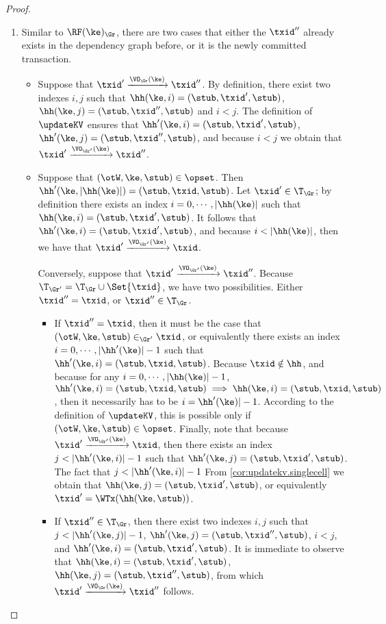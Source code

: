 \begin{proof}
\begin{enumerate}
\item 
Similar to \( \RF(\ke)_{\Gr} \), there are two cases that either the \( \txid'' \) already exists in the dependency graph before,
or it is the newly committed transaction.
\begin{itemize}
\item Suppose that $\txid' \xrightarrow{\VO_{\Gr}(\ke)} \txid''$. 
By definition, there exist two indexes $i, j$ such that 
$\hh(\ke, i) = (\stub, \txid', \stub)$, $\hh(\ke, j) = (\stub, \txid'', \stub)$ 
and $i < j$. The definition of $\updateKV$ ensures that 
$\hh'(\ke, i) = (\stub, \txid', \stub)$, $\hh'(\ke, j) = (\stub, \txid'', \stub)$, 
and because $i < j$ we obtain that $\txid' \xrightarrow{\VO_{\Gr'}(\ke)} \txid''$. 

\item Suppose that $(\otW, \ke, \stub) \in \opset$. Then $\hh'(\ke, \lvert \hh(\ke) \rvert) = (\stub, \txid, \stub)$.
Let $\txid' \in \T_{\Gr}$; by definition there exists an index $i = 0,\cdots, \lvert \hh(\ke) \rvert$ 
such that $\hh(\ke, i) = (\stub, \txid', \stub)$. It follows that $\hh'(\ke, i) = (\stub, \txid', \stub)$, and 
because $i < \lvert \hh(\ke) \rvert$, then we have that $\txid' \xrightarrow{\VO_{\Gr'}(\ke)} \txid$. 

Conversely, suppose that $\txid' \xrightarrow{\VO_{\Gr'}(\ke)} \txid''$. Because 
$\T_{\Gr'} = \T_{\Gr} \cup \Set{ \txid }$, we have two possibilities. Either $\txid'' = \txid$, 
or $\txid'' \in \T_{\Gr}$. 

\begin{itemize}
\item If $\txid'' = \txid$, then it must be the case that $(\otW, \ke, \stub) \in_{\Gr'} \txid$, 
or equivalently there exists an index $i=0,\cdots, \lvert \hh'(\ke) \rvert -1 $ such that 
$\hh'(\ke, i) = (\stub, \txid, \stub)$. Because $\txid \notin \hh$, and because for any 
$i = 0, \cdots, \lvert \hh(\ke) \rvert - 1$, $\hh'(\ke, i) = (\stub, \txid, \stub) \implies 
\hh(\ke, i) = (\stub, \txid, \stub)$, then it necessarily has to be $i = \hh'(\ke) \rvert - 1$. 
According to the definition of $\updateKV$, this is possible only if $(\otW,\ke, \stub) \in \opset$. 
Finally, note that because $\txid' \xrightarrow{\VO_{\Gr'}(\ke)} \txid$, then 
there exists an index $j < \lvert \hh'(\ke, i) \rvert - 1$ such that 
$\hh'(\ke, j) = (\stub, \txid' ,\stub)$. The fact that $j < \lvert \hh'(\ke, i) \rvert - 1$ 
From \cref{cor:updatekv.singlecell} we obtain that $\hh(\ke, j) = (\stub, \txid', \stub)$, 
or equivalently $\txid' = \WTx(\hh(\ke, \stub))$. 

\item If $\txid'' \in \T_{\Gr}$, then there exist two indexes $i,j$ such that 
$j < \lvert \hh'(\ke, j) \rvert - 1$, $\hh'(\ke, j) = (\stub, \txid'', \stub)$, 
$i < j$, and $\hh'(\ke, i) = (\stub, \txid', \stub)$. It is immediate to observe 
that $\hh(\ke, i) = (\stub, \txid', \stub)$, $\hh(\ke, j) = (\stub, \txid'', \stub)$, 
from which $\txid' \xrightarrow{\VO_{\Gr}(\ke)} \txid''$ follows. 
\end{itemize}
\end{itemize}

\end{enumerate}
\end{proof}
